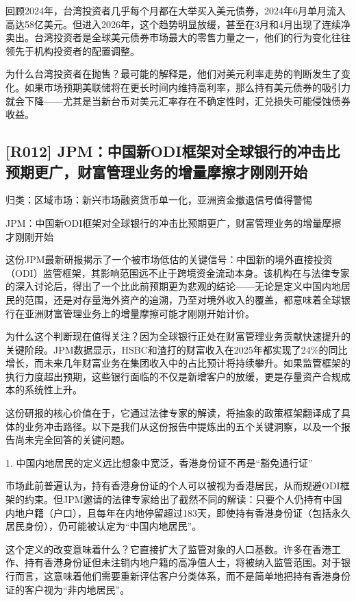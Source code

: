 \documentclass[11pt]{ctexart}
\begin{document}
回顾2024年，台湾投资者几乎每个月都在大举买入美元债券，2024年6月单月流入高达58亿美元。但进入2026年，这个趋势明显放缓，甚至在3月和4月出现了连续净卖出。台湾投资者是全球美元债券市场最大的零售力量之一，他们的行为变化往往领先于机构投资者的配置调整。

为什么台湾投资者在抛售？最可能的解释是，他们对美元利率走势的判断发生了变化。如果市场预期美联储将在更长时间内维持高利率，那么持有美元债券的吸引力就会下降——尤其是当新台币对美元汇率存在不确定性时，汇兑损失可能侵蚀债券收益。

\subsection{[R012] JPM：中国新ODI框架对全球银行的冲击比预期更广，财富管理业务的增量摩擦才刚刚开始}
{\small\color{refgray}归类：区域市场：新兴市场融资货币单一化，亚洲资金撤退信号值得警惕}

JPM：中国新ODI框架对全球银行的冲击比预期更广，财富管理业务的增量摩擦才刚刚开始

这份JPM最新研报揭示了一个被市场低估的关键信号：中国新的境外直接投资（ODI）监管框架，其影响范围远不止于跨境资金流动本身。该机构在与法律专家的深入讨论后，得出了一个比此前预期更为悲观的结论——无论是定义中国内地居民的范围，还是对存量海外资产的追溯，乃至对境外收入的覆盖，都意味着全球银行在亚洲财富管理业务上的增量摩擦可能才刚刚开始计价。

为什么这个判断现在值得关注？因为全球银行正处在财富管理业务贡献快速提升的关键阶段。JPM数据显示，HSBC和渣打的财富收入在2025年都实现了24\%的同比增长，而未来几年财富业务在集团收入中的占比预计将持续攀升。如果监管框架的执行力度超出预期，这些银行面临的不仅是新增客户的放缓，更是存量资产合规成本的系统性上升。

这份研报的核心价值在于，它通过法律专家的解读，将抽象的政策框架翻译成了具体的业务冲击路径。以下是我们从这份报告中提炼出的五个关键洞察，以及一个报告尚未完全回答的关键问题。

1. 中国内地居民的定义远比想象中宽泛，香港身份证不再是“豁免通行证”

市场此前普遍认为，持有香港身份证的个人可以被视为香港居民，从而规避ODI框架的约束。但JPM邀请的法律专家给出了截然不同的解读：只要个人仍持有中国内地户籍（户口），且每年在内地停留超过183天，即使持有香港身份证（包括永久居民身份），仍可能被认定为“中国内地居民”。

这个定义的改变意味着什么？它直接扩大了监管对象的人口基数。许多在香港工作、持有香港身份证但未注销内地户籍的高净值人士，将被纳入监管范围。对于银行而言，这意味着他们需要重新评估客户分类体系，而不是简单地把持有香港身份证的客户视为“非内地居民”。
\end{document}
